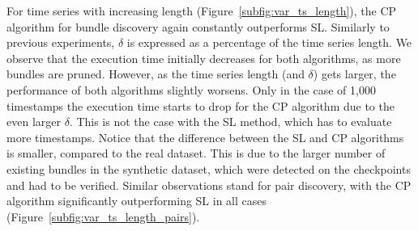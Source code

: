 For time series with increasing length (Figure~\ref{subfig:var_ts_length}), the CP algorithm for bundle discovery again constantly outperforms SL. Similarly to previous experiments, $\delta$ is expressed as a percentage of the time series length. We observe that the execution time initially decreases for both algorithms, as more bundles are pruned. However, as the time series length (and $\delta$) gets larger, the performance of both algorithms slightly worsens. Only in the case of 1,000 timestamps the execution time starts to drop for the CP algorithm due to the even larger $\delta$. This is not the case with the SL method, which has to evaluate more timestamps. Notice that the difference between the SL and CP algorithms is smaller, compared to the real dataset. This is due to the larger number of existing bundles in the synthetic dataset, which were detected on the checkpoints and had to be verified. Similar observations stand for pair discovery, with the CP algorithm significantly outperforming SL in all cases (Figure~\ref{subfig:var_ts_length_pairs}).
